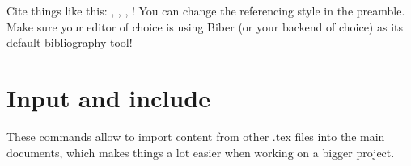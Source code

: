\documentclass[12pt, letterpaper]{article} %
\begin{document}
Cite things like this: 
\cite{dirac}, 
\cite{einstein}, 
\cite{knuth-fa}, 
\cite{knuthwebsite}! You can change the referencing style in the preamble. 
Make sure your editor of choice is using Biber (or your backend of choice) 
as its default bibliography tool!

\printbibliography

\clearpage

\section{Input and include}

These commands allow to import content from other .tex files into the main 
documents, which makes things a lot easier when working on a bigger project.


\end{document}
